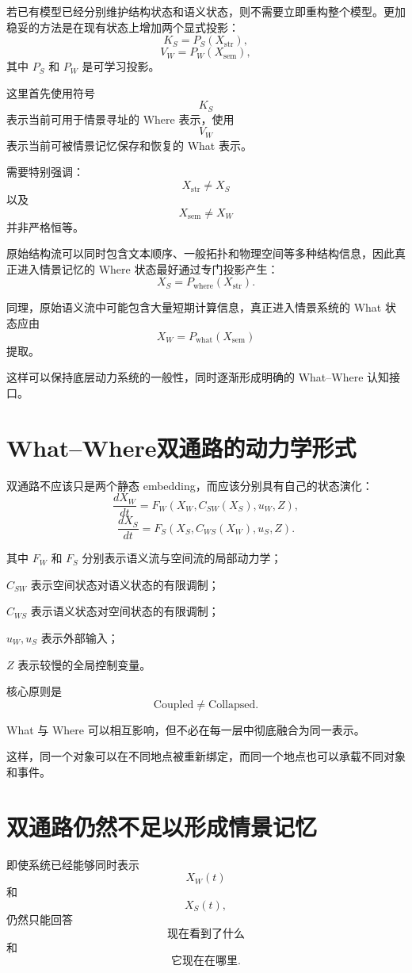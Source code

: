 若已有模型已经分别维护结构状态和语义状态，则不需要立即重构整个模型。更加稳妥的方法是在现有状态上增加两个显式投影：
\[
K_S
=
P_S(X_{\mathrm{str}}),
\]
\[
V_W
=
P_W(X_{\mathrm{sem}}),
\]
其中 $P_S$ 和 $P_W$ 是可学习投影。

这里首先使用符号
\[
K_S
\]
表示当前可用于情景寻址的 Where 表示，使用
\[
V_W
\]
表示当前可被情景记忆保存和恢复的 What 表示。

需要特别强调：
\[
\boxed{
X_{\mathrm{str}}
\neq
X_S
}
\]
以及
\[
\boxed{
X_{\mathrm{sem}}
\neq
X_W
}
\]
并非严格恒等。

原始结构流可以同时包含文本顺序、一般拓扑和物理空间等多种结构信息，因此真正进入情景记忆的 Where 状态最好通过专门投影产生：
\[
X_S
=
P_{\mathrm{where}}(X_{\mathrm{str}}).
\]

同理，原始语义流中可能包含大量短期计算信息，真正进入情景系统的 What 状态应由
\[
X_W
=
P_{\mathrm{what}}(X_{\mathrm{sem}})
\]
提取。

这样可以保持底层动力系统的一般性，同时逐渐形成明确的 What--Where 认知接口。

\section{What--Where双通路的动力学形式}

双通路不应该只是两个静态 embedding，而应该分别具有自己的状态演化：
\[
\frac{dX_W}{dt}
=
F_W
\left(
X_W,
C_{SW}(X_S),
u_W,
Z
\right),
\]
\[
\frac{dX_S}{dt}
=
F_S
\left(
X_S,
C_{WS}(X_W),
u_S,
Z
\right).
\]

其中 $F_W$ 和 $F_S$ 分别表示语义流与空间流的局部动力学；

$C_{SW}$ 表示空间状态对语义状态的有限调制；

$C_{WS}$ 表示语义状态对空间状态的有限调制；

$u_W,u_S$ 表示外部输入；

$Z$ 表示较慢的全局控制变量。

核心原则是
\[
\boxed{
\mathrm{Coupled}
\neq
\mathrm{Collapsed}.
}
\]

What 与 Where 可以相互影响，但不必在每一层中彻底融合为同一表示。

这样，同一个对象可以在不同地点被重新绑定，而同一个地点也可以承载不同对象和事件。

\section{双通路仍然不足以形成情景记忆}

即使系统已经能够同时表示
\[
X_W(t)
\]
和
\[
X_S(t),
\]
仍然只能回答
\[
\text{现在看到了什么}
\]
和
\[
\text{它现在在哪里}.
\]

